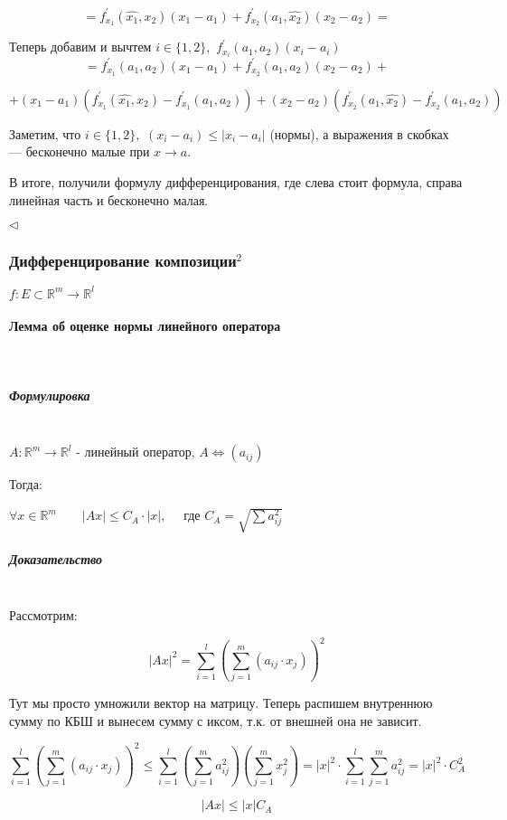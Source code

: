 \documentclass{article}
\def\dbl{\,\,}
\let\vanillaparagraph\paragraph
\let\vanillasubparagraph\subparagraph
\renewcommand{\paragraph}[1]{\vanillaparagraph{#1}\mbox{}\\}
\renewcommand{\subparagraph}[1]{\vanillasubparagraph{#1}\mbox{}\\}
\begin{document}
\[ = f^\prime_{x_1}(\hat{x_1}, x_2)(x_1 - a_1) + f^\prime_{x_2}(a_1, \hat{x_2})(x_2 - a_2) = \]

Теперь добавим и вычтем $i \in \{1, 2\}, \dbl f^\prime_{x_i}(a_1, a_2)(x_i - a_i)$
\[ = f^\prime_{x_1}(a_1, a_2)(x_1 - a_1) + f^\prime_{x_2}(a_1, a_2)(x_2 - a_2) + \]

\[+ (x_1 - a_1)(f^\prime_{x_1}(\hat{x_1}, x_2) - f^\prime_{x_1}(a_1, a_2)) + (x_2 - a_2)(f^\prime_{x_2}(a_1, \hat{x_2}) - f^\prime_{x_2}(a_1, a_2))\]

Заметим, что $i \in \{1, 2\}, \dbl (x_i - a_i) \le |x_i - a_i|$ (нормы), а выражения в скобках --- бесконечно малые при $x \rightarrow a$.

В итоге, получили формулу дифференцирования, где слева стоит формула, справа линейная часть и бесконечно малая.

$\lhd$

\subsubsection{Дифференцирование композиции\texorpdfstring{$^2$}{}}

$f: E \subset \mathbb R^m \to \mathbb R^l$

\paragraph{Лемма об оценке нормы линейного оператора}
\subparagraph{Формулировка}

$A: \mathbb R^m \to \mathbb R^l$ - линейный оператор, $A \Leftrightarrow (a_{ij})$

Тогда:

$\forall x \in \mathbb R^m \qquad |Ax| \leq C_A \cdot |x|, \quad$ где $C_A = \sqrt{\sum a_{ij}^2}$

\subparagraph{Доказательство}

Рассмотрим:

$$
|Ax|^2 = \sum_{i=1}^l\left(\sum_{j=1}^m (a_{ij} \cdot x_j)\right)^2
$$

Тут мы просто умножили вектор на матрицу. Теперь распишем внутреннюю сумму по КБШ и вынесем сумму с иксом, т.к. от внешней она не зависит.

$$
\sum_{i=1}^l\left(\sum_{j=1}^m (a_{ij} \cdot x_j)\right)^2 \leq \sum_{i = 1}^l \left(\sum_{j=1}^m a_{ij}^2\right)\left(\sum_{j = 1}^m x_j^2\right) = |x|^2 \cdot \sum_{i=1}^l\sum_{j=1}^m a_{ij}^2 = |x|^2 \cdot C_A^2
$$

$$
|Ax| \leq |x| C_A
$$
\end{document}

